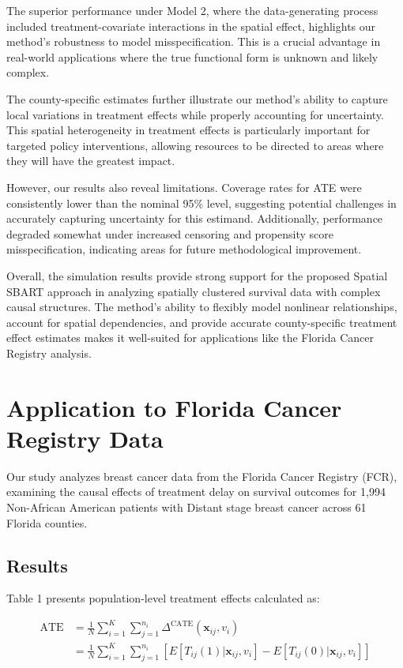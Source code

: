 \documentclass[useAMS,referee]{biom}
\begin{document}
The superior performance under Model 2, where the data-generating process included treatment-covariate interactions in the spatial effect, highlights our method's robustness to model misspecification. This is a crucial advantage in real-world applications where the true functional form is unknown and likely complex.

The county-specific estimates further illustrate our method's ability to capture local variations in treatment effects while properly accounting for uncertainty. This spatial heterogeneity in treatment effects is particularly important for targeted policy interventions, allowing resources to be directed to areas where they will have the greatest impact.

However, our results also reveal limitations. Coverage rates for ATE were consistently lower than the nominal 95\% level, suggesting potential challenges in accurately capturing uncertainty for this estimand. Additionally, performance degraded somewhat under increased censoring and propensity score misspecification, indicating areas for future methodological improvement.

Overall, the simulation results provide strong support for the proposed Spatial SBART approach in analyzing spatially clustered survival data with complex causal structures. The method's ability to flexibly model nonlinear relationships, account for spatial dependencies, and provide accurate county-specific treatment effect estimates makes it well-suited for applications like the Florida Cancer Registry analysis.





\section{Application to Florida Cancer Registry Data}

Our study analyzes breast cancer data from the Florida Cancer Registry (FCR), examining the causal effects of treatment delay on survival outcomes for 1,994 Non-African American patients with Distant stage breast cancer across 61 Florida counties.

\subsection{Results}

Table 1 presents population-level treatment effects calculated as:

\begin{align}
\text{ATE} &= \frac{1}{N}\sum_{i=1}^{K}\sum_{j=1}^{n_i}\Delta^{\text{CATE}}(\mathbf{x}_{ij}, v_i) \\
&= \frac{1}{N}\sum_{i=1}^{K}\sum_{j=1}^{n_i}[E[T_{ij}(1) | \mathbf{x}_{ij}, v_i] - E[T_{ij}(0) | \mathbf{x}_{ij}, v_i]]
\end{align}
\end{document}
